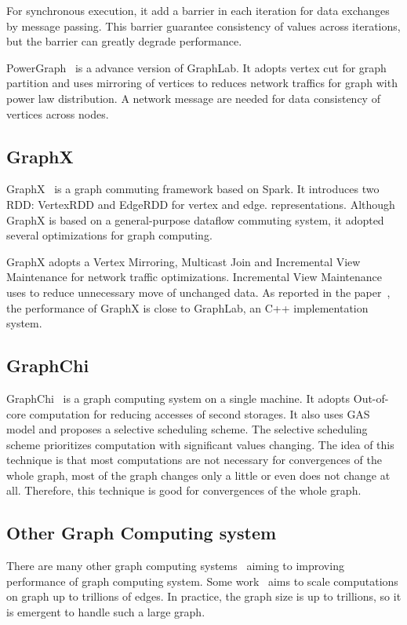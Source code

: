 For synchronous execution, it add a barrier in each
iteration for data exchanges by message passing.
This barrier guarantee consistency of values across
iterations, but the barrier can greatly degrade performance.

PowerGraph~\cite{powergraph} is a advance version of GraphLab.
It adopts vertex cut for graph partition and uses mirroring
of vertices to reduces network traffics for graph with power
law distribution. A network message are needed for data consistency of
vertices across nodes.

\subsection{GraphX}
GraphX~\cite{graphx} is a graph commuting framework based on Spark.
It introduces two RDD: VertexRDD and EdgeRDD for vertex and edge.
representations. Although GraphX is based on a general-purpose
dataflow commuting system, it adopted several optimizations for
graph computing.

GraphX adopts a Vertex Mirroring, Multicast Join and Incremental
View Maintenance
for network traffic optimizations.
Incremental View Maintenance uses to reduce unnecessary
move of unchanged data. As reported in the paper~\cite{graphx},
the performance of GraphX is close to GraphLab, an C++ implementation
system.

\subsection{GraphChi}
GraphChi~\cite{graphchi} is a graph computing system on a single machine.
It adopts Out-of-core computation for reducing accesses of second storages.
It also uses GAS model and proposes a selective scheduling scheme.
The selective scheduling scheme prioritizes computation with significant
values changing. The idea of this technique is that
most computations are not necessary for convergences of the whole graph,
most of the graph changes only a little or even does not change at all.
Therefore, this technique is good for convergences of the whole graph.

\subsection{Other Graph Computing system}
There are many other graph computing systems~\cite{zhang2015numa,gemini, mizan:load, xue2014seraph,miao2015immortalgraph} aiming to improving performance
of graph computing system. Some work~\cite{big:vldb16,graph:trillions, traversing:graph, facebook:graph}
aims to scale computations on graph up to trillions of edges.
In practice, the graph size is up to trillions, so it is emergent to
handle such a large graph.

